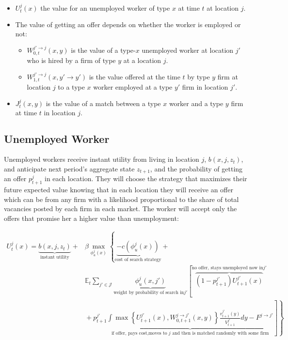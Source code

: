 \documentclass[
  letterpaper,
  DIV=11,
  numbers=noendperiod]{scrreprt}
\providecommand{\tightlist}{%
  \setlength{\itemsep}{0pt}\setlength{\parskip}{0pt}}\usepackage{longtable,booktabs,array}
\begin{document}
\begin{itemize}
\tightlist
\item
  \(U^{j}_t(x)\) the value for an unemployed worker of type \(x\) at
  time \(t\) at location \(j\).
\item
  The value of getting an offer depends on whether the worker is
  employed or not:

  \begin{itemize}
  \tightlist
  \item
    \(W^{j'\to j}_{0, t}(x,y)\) is the value of a type-\(x\) unemployed
    worker at location \(j'\) who is hired by a ﬁrm of type \(y\) at a
    location \(j\).
  \item
    \(W^{j'\to j}_{1, t}(x,y' \to y')\) is the value offered at the time
    \(t\) by type \(y\) firm at location \(j\) to a type \(x\) worker
    employed at a type \(y'\) firm in location \(j'\).
  \end{itemize}
\item
  \(J^j_t(x,y)\) is the value of a match between a type \(x\) worker and
  a type \(y\) firm at time \(t\) in location \(j\).
\end{itemize}

\hypertarget{unemployed-worker}{%
\subsection{Unemployed Worker}\label{unemployed-worker}}

Unemployed workers receive instant utility from living in location
\(j\), \(b(x,j, z_t)\), and anticipate next period's aggregate state
\(z_{t+1}\), and the probability of getting an offer \(p^j_{t+1}\) in
each location. They will choose the strategy that maximizes their future
expected value knowing that in each location they will receive an offer
which can be from any firm with a likelihood proportional to the share
of total vacancies posted by each firm in each market. The worker will
accept only the offers that promise her a higher value than
unemployment:

\begin{align*}
U^{j}_{t}(x) = \underbrace{b(x,j,z_t)}_{\text{instant utility}} + &\beta\max_{\phi^j_u(x)}\left\{ \underbrace{-c(\phi^j_u(x))}_{\text{cost of search strategy}} \right.  + \\
& \mathbb{E}_{t}\sum_{j'\in \mathcal{J}} \underbrace{\phi^j_u(x, j')}_{\text{weight by probability of search in} j'}\left[ \overbrace{(1-p^{j'}_{t+1})U^{j'}_{t+1}(x)}^{\text{no offer, stays unemployed now in} j'} \right.  \\
& \left. \left. \hspace{0cm} + p^{j'}_{t+1} \underbrace{\int \max\left\{U^{j'}_{t+1}(x),W^{j\to j'}_{0, t+1}(x,y)\right\}\frac{v^{j'}_{t+1}(y)}{V^{j'}_{t+1}}dy - F^{j \to j'}}_{\text{if offer, pays cost,moves to } j \text{ and then is matched randomly with some firm}} \right] \right\} 
\end{align*}
\end{document}
